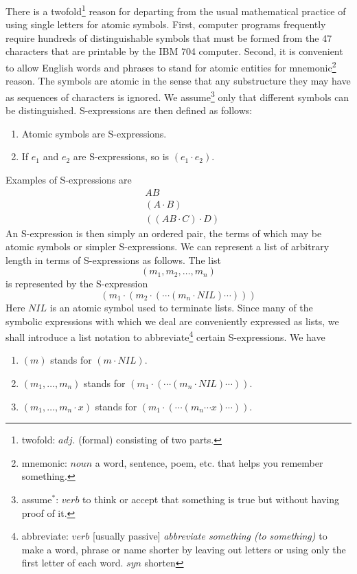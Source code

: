 \documentclass[11pt, a4paper]{article}
\begin{document}
There is a
twofold\footnote{twofold: $adj.$ (formal) consisting of two parts.}
reason for departing from the usual mathematical practice of
using single letters for atomic symbols. First, computer programs frequently
require hundreds of distinguishable symbols that must be formed from the 47
characters that are printable by the IBM 704 computer. Second, it is convenient
to allow English words and phrases to stand for atomic entities for
mnemonic\footnote{mnemonic: $noun$ a word, sentence, poem, etc. that helps you
  remember something.}
reason. The symbols are atomic in the sense that any substructure they may have
as sequences of characters is ignored. We
assume\footnote{assume$^*$: $verb$ to think or accept that something is true but
  without having proof of it.}
only that different symbols can
be distinguished. S-expressions are then defined as follows:
\begin{enumerate}
\item Atomic symbols are S-expressions.
\item If $e_1$ and $e_2$ are S-expressions, so is $(e_1 \cdot e_2)$.
\end{enumerate}
Examples of S-expressions are
\begin{align*}
&AB          \\
&(A \cdot B) \\
&((AB \cdot C) \cdot D)
\end{align*}
An S-expression is then simply an ordered pair, the terms of which may be atomic
symbols or simpler S-expressions. We can represent a list of arbitrary length in
terms of S-expressions as follows. The list
$$ (m_1, m_2, \ldots, m_n) $$
is represented by the S-expression
$$ (m_1 \cdot (m_2 \cdot ( \cdots (m_n \cdot NIL) \cdots ))) $$
Here $NIL$ is an atomic symbol used to terminate lists. Since many of the
symbolic expressions with which we deal are conveniently expressed as lists, we
shall introduce a list notation to
abbreviate\footnote{abbreviate: $verb$ [usually passive] \textit{abbreviate
    something (to something)} to make a word, phrase or name shorter by leaving
  out letters or using only the first letter of each word. $syn$ shorten}
certain S-expressions. We have
\begin{enumerate}
\item $(m)$ stands for $(m \cdot NIL)$.
\item $(m_1, \ldots, m_n)$ stands for
  $(m_1 \cdot ( \cdots (m_n \cdot NIL) \cdots ))$.
\item $(m_1, \ldots, m_n \cdot x)$ stands for
  $(m_1 \cdot ( \cdots (m_n \cdots x) \cdots ))$.
\end{enumerate}
\end{document}
